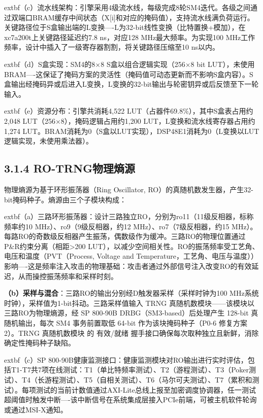 \documentclass[journal]{IEEEtran}
\begin{document}
	extbf{（c）流水线架构}：引擎采用4级流水线，每级完成8轮SM4迭代。各级之间通过双端口BRAM缓存中间状态（X[i]和对应的掩码值），支持流水线满负荷运行。关键路径位于S盒输出端的L变换----L为32-bit线性变换（比特置换+模加），在xc7a200t上关键路径延迟约7.8 ns，对应128 MHz最大频率。为实现100 MHz工作频率，设计中插入了一级寄存器割割，将关键路径压缩至10 ns以内。

	extbf{（d）S盒实现}：SM4的8$\times$8 S盒以组合逻辑实现（256$\times$8 bit LUT），未使用BRAM----这保证了掩码方案的灵活性（掩码值可动态更新而不影响S盒内容）。S盒输出经掩码异或后进入L变换，L变换的32-bit输出与轮密钥异或后反馈至下一轮输入。

	extbf{（e）资源分布}：引擎共消耗4,522 LUT（占器件69.8\%），其中S盒表占用约2,048 LUT（256$\times$8），掩码逻辑占用约1,200 LUT，L变换和流水线寄存器占用约1,274 LUT。BRAM消耗为0（S盒以LUT实现），DSP48E1消耗为0（L变换以LUT逻辑实现，未使用乘法器）。

\subsection{3.1.4 RO-TRNG物理熵源}

物理熵源为基于环形振荡器（Ring Oscillator, RO）的真随机数发生器，产生32-bit掩码种子。熵源由三个子模块构成：

	extbf{（a）三路环形振荡器}：设计三路独立RO，分别为ro11（11级反相器，标称频率约10 MHz）、ro9（9级反相器，约12 MHz）、ro7（7级反相器，约15 MHz）。每路RO的奇数级反相器产生振荡，偶数级作为缓冲。三路RO的物理位置通过P\&R约束分离（相距>200 LUT），以减少空间相关性。RO的振荡频率受工艺角、电压和温度（PVT（Process, Voltage and Temperature，工艺角、电压与温度））影响----这是频率注入攻击的物理基础：攻击者通过外部信号注入改变RO的有效延迟，从而操控振荡频率和采样时刻。

\textbf{（b）采样与混合}：三路RO的输出分别经D触发器采样（采样时钟为100 MHz系统时钟），采样值为1-bit抖动。三路采样值输入 TRNG 真随机数模块——该模块以三路RO为物理熵源，经 SP 800-90B DRBG（SM3-based）后处理产生 128-bit 真随机输出，每次 SM4 事务前置取低 64-bit 作为该块掩码种子（P0-6 修复方案2）。TRNG 真随机数模块 的 有效/就绪 握手接口确保每次取种独立且新鲜，消除确定性掩码种子缺陷。

	extbf{（c）SP 800-90B健康监测接口}：健康监测模块对RO输出进行实时评估，包括T1-T7共7项在线测试：T1（单比特频率测试）、T2（游程测试）、T3（Poker测试）、T4（长游程测试）、T5（自相关测试）、T6（马尔可夫测试）、T7（累积和测试）。每项测试的当前计数值通过AXI-Lite总线上报至加密调度协调器，任一测试超阈值时触发中断----该中断信号在系统集成层接入PCIe前端，可被主机软件轮询或通过MSI-X通知。
\end{document}
